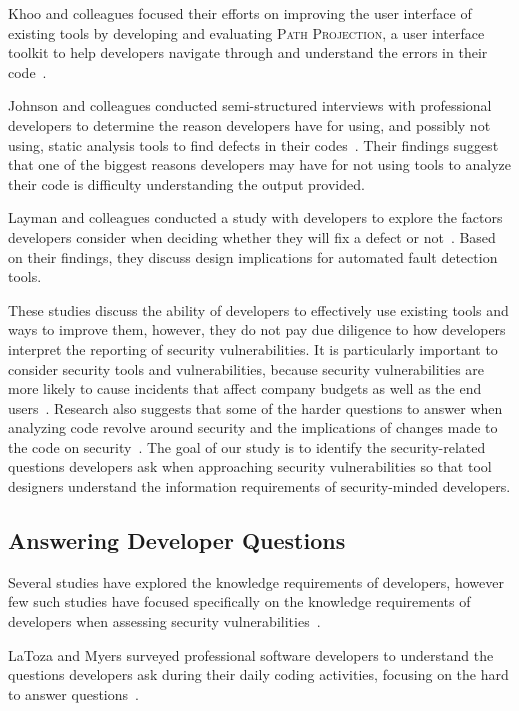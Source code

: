 \documentclass[conference]{IEEEtran}
\begin{document}
Khoo and colleagues focused their efforts on improving the user interface of existing tools by developing and evaluating \textsc{Path Projection}, a user interface toolkit to help developers navigate through and understand the errors in their code~\cite{khoo2008path}.

Johnson and colleagues conducted semi-structured interviews with professional developers to determine the reason developers have for using, and possibly not using, static analysis tools to find defects in their codes~\cite{johnson2013don}. 
Their findings suggest that one of the biggest reasons developers may have for not using tools to analyze their code is difficulty understanding the output provided. 

Layman and colleagues conducted a study with developers to explore the factors developers consider when deciding whether they will fix a defect or not~\cite{layman2007toward}. Based on their findings, they discuss design implications for automated fault detection tools.

These studies discuss the ability of developers to effectively use existing tools and ways to improve them, however, they do not pay due diligence to how developers interpret the reporting of security vulnerabilities. 
It is particularly important to consider security tools and vulnerabilities, because security vulnerabilities are more likely to cause incidents that affect company budgets as well as the end users~\cite{chen2002mops}. 
Research also suggests that some of the harder questions to answer when analyzing code revolve around security and the implications of changes made to the code on security~\cite{latoza2010hard}.  
The goal of our study is to identify the security-related questions developers ask when approaching security vulnerabilities so that tool designers understand the information requirements of security-minded developers.

\subsection{Answering Developer Questions}
\label{questions}
Several studies have explored the knowledge requirements of developers, however few such studies have focused specifically on the knowledge requirements of developers when assessing security vulnerabilities~\cite{begel2014analyze, latoza2010hard, latoza2010developers}.

LaToza and Myers surveyed professional software developers to understand the questions developers ask during their daily coding activities, focusing on the hard to answer questions~\cite{latoza2010hard}. 
\end{document}
